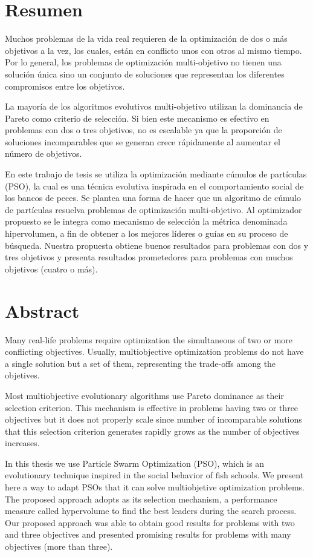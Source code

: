 \chapter*{Resumen}

  Muchos problemas de la vida real requieren de la optimizaci\'on de dos o m\'as objetivos a la vez, los cuales, 
  est\'an en conflicto unos con otros al mismo tiempo. Por lo general, los problemas de optimizaci\'on multi-objetivo
  no tienen una soluci\'on \'unica sino un conjunto de soluciones que representan los diferentes compromisos entre 
  los objetivos. 
  
  La mayor\'ia de los algoritmos evolutivos multi-objetivo utilizan la dominancia de Pareto como criterio de
  selecci\'on. Si bien este mecanismo es efectivo en problemas con dos o tres objetivos, no es escalable ya 
  que la proporci\'on de soluciones incomparables que se generan crece r\'apidamente al aumentar el n\'umero de objetivos.
  
  En este trabajo de tesis se utiliza la optimizaci\'on mediante c\'umulos de part\'iculas 
  (PSO), la cual es una t\'ecnica evolutiva inspirada en el comportamiento social de los bancos de peces. Se plantea 
  una forma de hacer que un algoritmo de c\'umulo de part\'iculas resuelva problemas de optimizaci\'on multi-objetivo.
  Al optimizador propuesto se le integra como mecanismo de selecci\'on la m\'etrica denominada hipervolumen, 
  a fin de obtener a los mejores l\'ideres o gu\'ias en su proceso de b\'usqueda. Nuestra propuesta obtiene buenos resultados 
  para problemas con dos y tres objetivos y presenta resultados prometedores para problemas con muchos objetivos (cuatro o 
  m\'as).


\chapter*{Abstract}

  Many real-life problems require optimization the simultaneous of two or more conflicting objectives. 
  Usually, multiobjective optimization problems do not have a single solution but a set of them,
  representing the trade-offs among the objetives.
  
  Most multiobjective evolutionary algorithms use Pareto dominance as their selection criterion. This 
  mechanism is effective in problems having two or three objectives but it does not properly scale since 
  number of incomparable solutions that this selection criterion generates rapidly grows as the
  number of objectives increases.

  In this thesis we use Particle Swarm Optimization (PSO), which is an evolutionary technique inspired in the social 
  behavior of fish schools. We present here a way to adapt PSOs that it can solve multiobjetive optimization problems.
  The proposed approach adopts as its selection mechanism, a performance measure called hypervolume to find the best leaders
  during the search process. Our proposed approach was able to obtain good results for problems with two and three 
  objectives and presented promising results for problems with many objectives (more than three).